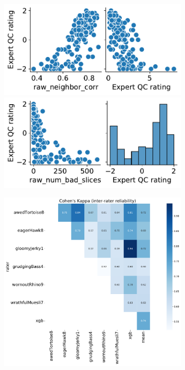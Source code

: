 \documentclass[fleqn,10pt]{wlscirep}
\begin{document}
\begin{figure}[ht]
    \begin{subfigure}{.5\textwidth}
    \centering
    \includegraphics[width=\linewidth]{community-qc/expert-qsiprep-pairplot-top.pdf}
    \includegraphics[width=\linewidth]{community-qc/expert-qsiprep-pairplot-bottom.pdf}
    \caption{}
    \label{fig:expert-qc:scatter}
    \end{subfigure}
    \begin{subfigure}{.5\textwidth}
    \centering
    \includegraphics[width=\linewidth]{community-qc/expert-raters-cohens-kappa.pdf}

\end{subfigure}
\end{figure}
\end{document}
